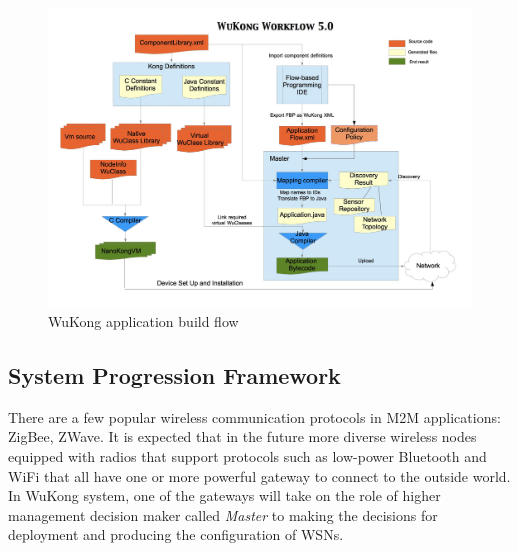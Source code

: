 \begin{figure}[h!]
\centering
    \includegraphics[width=\linewidth]{figures/wukong-flow}
\caption{WuKong application build flow}
\label{fig:wukong-flow}
\end{figure}

\subsection{System Progression Framework}

There are a few popular wireless communication protocols in M2M applications:
ZigBee, ZWave. It is expected that in the future more diverse
wireless nodes equipped with radios that support protocols such as low-power
Bluetooth and WiFi that all have one or more powerful gateway to connect to the
outside world. In WuKong system, one of the gateways will take on the role of
higher management decision maker called \emph{Master} to making the decisions for
deployment and producing the configuration of WSNs.


